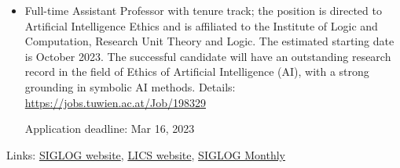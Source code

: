 \documentclass[prodmode,acmtecs]{acmsmall} %
\begin{document}
\begin{itemize}\item  Full-time Assistant Professor with tenure track; the position is directed to Artificial Intelligence Ethics and is affiliated to the Institute of Logic and Computation, Research Unit Theory and Logic. The estimated starting date is October 2023. The successful candidate will have an outstanding research record in the field of Ethics of Artificial Intelligence (AI), with a strong grounding in symbolic AI methods. Details: \href{https://jobs.tuwien.ac.at/Job/198329}{https://jobs.tuwien.ac.at/Job/198329} 
 
Application deadline: Mar 16, 2023 
 
\end{itemize}


\bigskip Links: \href{http://siglog.org/}{SIGLOG website}, \href{https://lics.siglog.org}{LICS website}, \href{https://lics.siglog.org/newsletters/}{SIGLOG Monthly}
\end{document}
